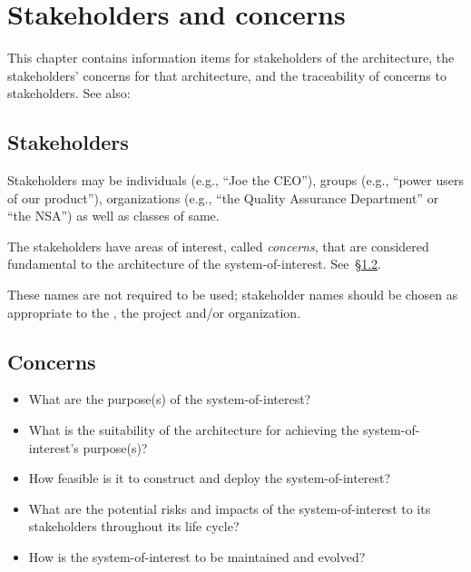\documentclass[10pt,oneside]{report}
\begin{document}
\chapter{Stakeholders and concerns}\label{sec:snc}

This chapter contains information items for stakeholders of the 
architecture, the stakeholders' concerns for that architecture, and
the traceability of concerns to stakeholders. See also:~

\section{Stakeholders}\label{ad:stakeholders}


  Stakeholders may be individuals (e.g., ``Joe the CEO''), groups
  (e.g., ``power users of our product''), organizations (e.g., ``the
  Quality Assurance Department'' or ``the NSA'') as well as classes of
  same.

  The stakeholders have areas of interest, called \textit{concerns},
  that are considered fundamental to the architecture of the
  system-of-interest. See~\S\ref{ad:concerns}.


  These names are not required to be used; stakeholder names should be
  chosen as appropriate to the , the
  project and/or organization.


\section{Concerns}\label{ad:concerns}



\begin{itemize}
\item What are the purpose(s) of the system-of-interest?
\item What is the suitability of the architecture for achieving the
  system-of-interest's purpose(s)?
\item How feasible is it to construct and deploy the
  system-of-interest?
\item What are the potential risks and impacts of the
  system-of-interest to its stakeholders throughout its life cycle?
\item How is the system-of-interest to be maintained and evolved?
\end{itemize}
\end{document}
